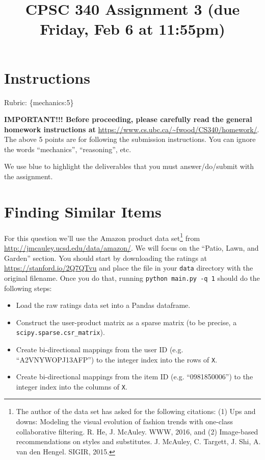 \documentclass{article}
\def\rubric#1{\gre{Rubric: \{#1\}}}{}
\def\blu#1{{\color{blu}#1}}
\def\gre#1{{\color{gre}#1}}
\begin{document}
\title{CPSC 340 Assignment 3 (due Friday, Feb 6 at 11:55pm)}
\date{}
\maketitle

\vspace{-7em}

\section*{Instructions}
\rubric{mechanics:5}

\textbf{IMPORTANT!!! Before proceeding, please carefully read the general homework instructions at} \url{https://www.cs.ubc.ca/~fwood/CS340/homework/}. The above 5 points are for following the submission instructions. You can ignore the words ``mechanics'', ``reasoning'', etc.

\vspace{1em}
We use \blu{blue} to highlight the deliverables that you must answer/do/submit with the assignment.


\section{Finding Similar Items}

For this question we'll use the Amazon product data set\footnote{The author of the data set has asked for the following citations: (1) Ups and downs: Modeling the visual evolution of fashion trends with one-class collaborative filtering. R. He, J. McAuley. WWW, 2016, and (2) Image-based recommendations on styles and substitutes. J. McAuley, C. Targett, J. Shi, A. van den Hengel. SIGIR, 2015.} from \url{http://jmcauley.ucsd.edu/data/amazon/}. We will focus on the ``Patio, Lawn, and Garden'' section. You should start by downloading the ratings at \\
\url{https://stanford.io/2Q7QTvu} and place the file in your \texttt{data} directory with the original filename. Once you do that, running \texttt{python main.py -q 1} should do the following steps:

\begin{itemize}
\item Load the raw ratings data set into a Pandas dataframe.
\item Construct the user-product matrix as a sparse matrix (to be precise, a \verb|scipy.sparse.csr_matrix|).
\item Create bi-directional mappings from the user ID (e.g. ``A2VNYWOPJ13AFP'') to the integer index into the rows of \texttt{X}.
\item Create bi-directional mappings from the item ID (e.g. ``0981850006'') to the integer index into the columns of \texttt{X}.
\end{itemize}
\end{document}
